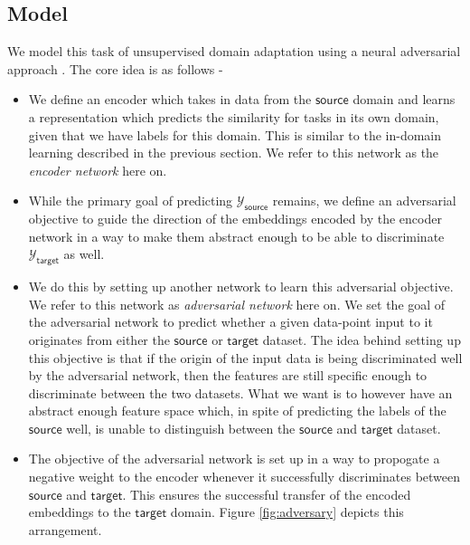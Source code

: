 \documentclass{sigkddExp}
\begin{document}
\subsection{Model}
We model this task of unsupervised domain adaptation using a neural adversarial approach \cite{ganin2015unsupervised}. The core idea is as follows - 
\begin{itemize}[topsep=0pt,itemsep=-1ex,partopsep=1ex,parsep=1ex]
    \item We define an encoder which takes in data from the $\mathsf{source}$ domain and learns a representation which predicts the similarity for tasks in its own domain, given that we have labels for this domain. This is similar to the in-domain learning described in the previous section. We refer to this network as the \textit{encoder network} here on.
    \item While the primary goal of predicting $\mathcal{Y}_\mathsf{source}$ remains, we define an adversarial objective to guide the direction of the embeddings encoded by the encoder network in a way to make them abstract enough to be able to discriminate $\mathcal{Y}_\mathsf{target}$ as well.
    \item We do this by setting up another network to learn this adversarial objective. We refer to this network as \textit{adversarial network} here on. We set the goal of the adversarial network to predict whether a given data-point input to it originates from either the $\mathsf{source}$ or $\mathsf{target}$ dataset. The idea behind setting up this objective is that if the origin of the input data is being discriminated well by the adversarial network, then the features are still specific enough to discriminate between the two datasets. What we want is to however have an abstract enough feature space which, in spite of predicting the labels of the $\mathsf{source}$ well, is unable to distinguish between the $\mathsf{source}$ and $\mathsf{target}$ dataset.
    \item The objective of the adversarial network is set up in a way to propogate a negative weight to the encoder whenever it successfully discriminates between $\mathsf{source}$ and $\mathsf{target}$. This ensures the successful transfer of the encoded embeddings to the $\mathsf{target}$ domain. Figure \ref{fig:adversary} depicts this arrangement.
\end{itemize}
\end{document}
